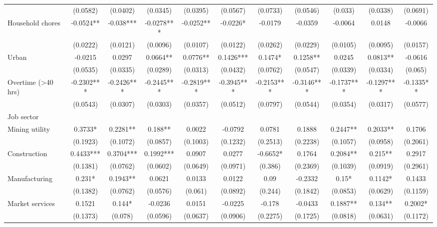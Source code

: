 \begin{table}[htbp]
{\begin{tabular}{lcccccccccc}
& (0.0582) & (0.0402) & (0.0345) & (0.0395) & (0.0567) & (0.0733) & (0.0546) & (0.033) & (0.0338) & (0.0691) \\ 
Household chores & -0.0524** & -0.038*** & -0.0278*** & -0.0252** & -0.0226* & -0.0179 & -0.0359 & -0.0064 & 0.0148 & -0.0066 \\
& (0.0222) & (0.0121) & (0.0096) & (0.0107) & (0.0122) & (0.0262) & (0.0229) & (0.0105) & (0.0095) & (0.0157) \\ 
Urban & -0.0215 & 0.0297 & 0.0664** & 0.0776** & 0.1426*** & 0.1474* & 0.1258** & 0.0245 & 0.0813** & -0.0616 \\
& (0.0535) & (0.0335) & (0.0289) & (0.0313) & (0.0432) & (0.0762) & (0.0547) & (0.0339) & (0.0334) & (0.065) \\ 
Overtime (>40 hrs) & -0.2302*** & -0.2426*** & -0.2445*** & -0.2819*** & -0.3945*** & -0.2153*** & -0.3146*** & -0.1737*** & -0.1297*** & -0.1335** \\
& (0.0543) & (0.0307) & (0.0303) & (0.0357) & (0.0512) & (0.0797) & (0.0544) & (0.0354) & (0.0317) & (0.0577) \\ 
Job sector &&&&&&&&&&\\
\hspace{1em}Mining utility & 0.3733* & 0.2281** & 0.188** & 0.0022 & -0.0792 & 0.0781 & 0.1888 & 0.2447** & 0.2033** & 0.1706 \\
& (0.1923) & (0.1072) & (0.0857) & (0.1003) & (0.1232) & (0.2513) & (0.2238) & (0.1057) & (0.0958) & (0.2061) \\ 
\hspace{1em}Construction & 0.4433*** & 0.3704*** & 0.1992*** & 0.0907 & 0.0277 & -0.6652* & 0.1764 & 0.2084** & 0.215** & 0.2917 \\
& (0.1381) & (0.0762) & (0.0602) & (0.0649) & (0.0971) & (0.386) & (0.2369) & (0.1039) & (0.0919) & (0.2961) \\ 
\hspace{1em}Manufacturing & 0.231* & 0.1943** & 0.0621 & 0.0133 & 0.0122 & 0.09 & -0.2332 & 0.15* & 0.1142* & 0.1433 \\
& (0.1382) & (0.0762) & (0.0576) & (0.061) & (0.0892) & (0.244) & (0.1842) & (0.0853) & (0.0629) & (0.1159) \\ 
\hspace{1em}Market services & 0.1521 & 0.144* & -0.0236 & 0.0151 & -0.0225 & -0.178 & -0.0433 & 0.1887** & 0.134** & 0.2002* \\
& (0.1373) & (0.078) & (0.0596) & (0.0637) & (0.0906) & (0.2275) & (0.1725) & (0.0818) & (0.0631) & (0.1172) \\ 

\end{tabular}}
\end{table}
